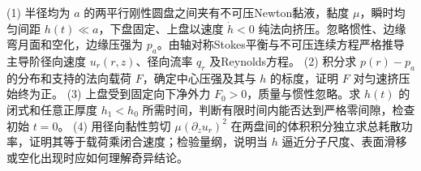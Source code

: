 (1) 半径均为 \(a\) 的两平行刚性圆盘之间夹有不可压Newton黏液，黏度 \(\mu\)，瞬时均匀间距 \(h(t)\ll a\)，下盘固定、上盘以速度 \(\dot h<0\) 纯法向挤压。忽略惯性、边缘弯月面和空化，边缘压强为 \(p_a\)。由轴对称Stokes平衡与不可压连续方程严格推导主导阶径向速度 \(u_r(r,z)\)、径向流率 \(q_r\) 及Reynolds方程。
(2) 积分求 \(p(r)-p_a\) 的分布和支持的法向载荷 \(F\)，确定中心压强及其与 \(h\) 的标度，证明 \(F\) 对匀速挤压始终为正。
(3) 上盘受到固定向下净外力 \(F_0>0\)，质量与惯性忽略。求 \(h(t)\) 的闭式和任意正厚度 \(h_1<h_0\) 所需时间，判断有限时间内能否达到严格零间隙，检查初始 \(t=0\)。
(4) 用径向黏性剪切 \(\mu(\partial_z u_r)^2\) 在两盘间的体积积分独立求总耗散功率，证明其等于载荷乘闭合速度；检验量纲，说明当 \(h\) 逼近分子尺度、表面滑移或空化出现时应如何理解奇异结论。
